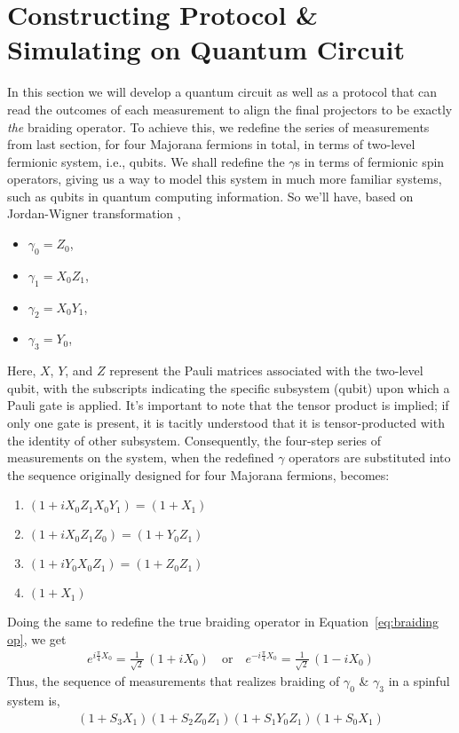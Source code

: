 \documentclass{article}
\begin{document}
\section{Constructing Protocol \& Simulating on Quantum Circuit} %
\label{sec:Constructing Protocol}
In this section we will develop a quantum circuit as well as a protocol that can read the outcomes of each measurement to align the final projectors to be exactly \textit{the} braiding operator. To achieve this, we redefine the series of measurements from last section, for four Majorana fermions in total, in terms of two-level fermionic system, i.e., qubits. We shall redefine the $ \gamma $s in terms of fermionic spin operators, giving us a way to model this system in much more familiar systems, such as qubits in quantum computing information. So we'll have, based on Jordan-Wigner transformation \cite{Backens_2017},
\begin{itemize}
	\item $ \gamma_0 = Z_0 $,
	\item $ \gamma_1 = X_0 Z_1 $,
	\item $ \gamma_2 = X_0 Y_1 $,
	\item $ \gamma_3 = Y_0 $,
\end{itemize}
Here, \(X\), \(Y\), and \(Z\) represent the Pauli matrices associated with the two-level qubit, with the subscripts indicating the specific subsystem (qubit) upon which a Pauli gate is applied. It's important to note that the tensor product is implied; if only one gate is present, it is tacitly understood that it is tensor-producted with the identity of other subsystem. Consequently, the four-step series of measurements on the system, when the redefined \( \gamma \) operators are substituted into the sequence originally designed for four Majorana fermions, becomes:
\begin{enumerate}
	\item $ (1 + i X_0 Z_1 X_0 Y_1) = (1 + X_1) $
	\item $ (1 + i X_0 Z_1 Z_0) = (1 + Y_0 Z_1) $
	\item $ (1 + i Y_0 X_0 Z_1) = (1 + Z_0 Z_1) $
	\item $ (1 + X_1) $
\end{enumerate}
Doing the same to redefine the true braiding operator in Equation~\ref{eq:braiding op}, we get
$$
	\begin{aligned}
		e^{i \frac{\pi}{4} X_0} = \frac{1}{\sqrt{2}}\, (1 + i X_0 ) \quad \text{or} \quad
		e^{-i \frac{\pi}{4} X_0} = \frac{1}{\sqrt{2}}\, (1 - i X_0 )
		\label{eq:br Jordan-Wigner}
	\end{aligned}
$$
Thus, the sequence of measurements that realizes braiding of $ \gamma_0 $ \& $ \gamma_3 $ in a spinful system is,
\begin{equation}
	\begin{aligned}
		(1 +S_3 X_1) (1 +S_2 Z_0 Z_1) (1 +S_1 Y_0 Z_1) (1 +S_0 X_1)
		\label{eq:fermionic meas seq}
	\end{aligned}
\end{equation}
\end{document}
